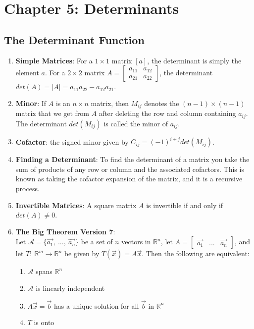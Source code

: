 \documentclass[10pt]{article}
\begin{document}
\section{Chapter 5: Determinants}
\subsection{The Determinant Function}
\begin{enumerate}
\item \textbf{Simple Matrices}: For a $1 \times 1$ matrix $[a]$, the determinant is simply the element $a$. For a $2 \times 2$ matrix 
$A = \begin{bmatrix}
a_{11} & a_{12} \\
a_{21} & a_{22}
\end{bmatrix}$, the determinant $det(A) = |A| = a_{11}a_{22} - a_{12}a_{21}$.
\item \textbf{Minor}: If $A$ is an $n \times n$ matrix, then $M_{ij}$ denotes the $(n-1) \times (n-1)$ matrix that we get from $A$ after deleting the row and column containing $a_{ij}$. The determinant $det(M_{ij})$ is called the minor of $a_{ij}$.
\item \textbf{Cofactor}: the signed minor given by $C_{ij} = (-1)^{i+j}det(M_{ij})$.	
\item \textbf{Finding a Determinant}: To find the determinant of a matrix you take the sum of products of any row or column and the associated cofactors. This is known as taking the cofactor expansion of the matrix, and it is a recursive process.
\item \textbf{Invertible Matrices}: A square matrix $A$ is invertible if and only if $det(A) \neq 0$.
\item \textbf{The Big Theorem Version 7}: \\
Let $\mathcal{A} = \lbrace \vec{a_1},\ ...,\ \vec{a_n} \rbrace$ be a set of $n$ vectors in $\mathbb{R}^n$, let $A = \begin{bmatrix}
\vec{a_1} & ... & \vec{a_n}
\end{bmatrix}$, and let $T:\ \mathbb{R}^m \rightarrow \mathbb{R}^n$ be given by $T(\vec{x}) = A\vec{x}$. Then the following are equivalent:
\begin{enumerate}
\item $\mathcal{A}$ spans $\mathbb{R}^n$
\item $\mathcal{A}$ is linearly independent
\item $A\vec{x} = \vec{b}$ has a unique solution for all $\vec{b}$ in $\mathbb{R}^n$
\item $T$ is onto

\end{enumerate}
\end{enumerate}
\end{document}
